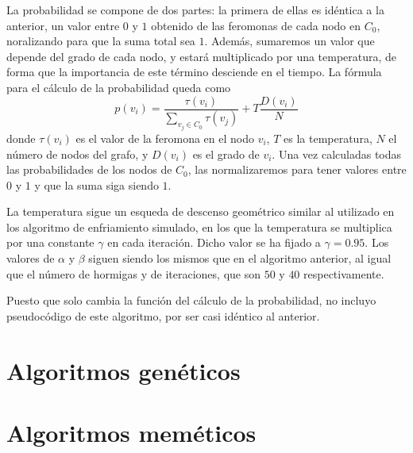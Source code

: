 La probabilidad se compone de dos partes: la primera de ellas es idéntica a la anterior, un valor entre $0$ y $1$
obtenido de las feromonas de cada nodo en $C_0$, noralizando para que la suma total sea $1$. Además, sumaremos un
valor que depende del grado de cada nodo, y estará multiplicado por una temperatura, de forma que la importancia
de este término desciende en el tiempo. La fórmula para el cálculo de la probabilidad queda como
\[ p(v_i) = \frac{\tau(v_i)}{\sum_{v_j \in C_0} \tau(v_j)} + T \frac{D(v_i)}{N} \]
donde $\tau(v_i)$ es el valor de la feromona en el nodo $v_i$, $T$ es la temperatura, $N$ el número de nodos
del grafo, y $D(v_i)$ es el grado de $v_i$. Una vez calculadas todas las probabilidades de los nodos de $C_0$,
las normalizaremos para tener valores entre $0$ y $1$ y que la suma siga siendo $1$.

La temperatura sigue un esqueda de descenso geométrico similar al utilizado en los algoritmo de enfriamiento simulado,
en los que la temperatura se multiplica por una constante $\gamma$ en cada iteración. Dicho valor se ha fijado a
$\gamma = 0.95$. Los valores de $\alpha$ y $\beta$ siguen siendo los mismos que en el algoritmo anterior, al igual
que el número de hormigas y de iteraciones, que son $50$ y $40$ respectivamente.

Puesto que solo cambia la función del cálculo de la probabilidad, no incluyo pseudocódigo de este algoritmo,
por ser casi idéntico al anterior.

\section{Algoritmos genéticos}


\section{Algoritmos meméticos}
